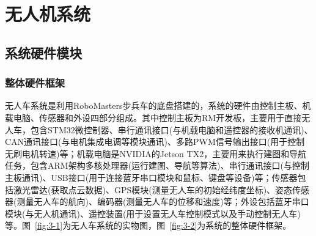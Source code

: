 
\chapter{无人机系统}
\section{系统硬件模块}
\subsection{整体硬件框架}
无人车系统是利用RoboMasters步兵车的底盘搭建的，系统的硬件由控制主板、机载电脑、传感器和外设四部分组成。其中控制主板为RM开发板，主要用于直接无人车，包含STM32微控制器、串行通讯接口(与机载电脑和遥控器的接收机通讯)、CAN通讯接口(与电机集成电调等模块通讯)、多路PWM信号输出接口(用于控制无刷电机转速)等；机载电脑是NVIDIA的Jetson TX2，主要用来执行建图和导航任务，包含ARM架构多核处理器(运行建图、导航等算法)、串行通讯接口(与控制主板通讯)、USB接口(用于连接蓝牙串口模块和鼠标、键盘等设备)等；传感器包括激光雷达(获取点云数据)、GPS模块(测量无人车的初始经纬度坐标)、姿态传感器(测量无人车的航向)、编码器(测量无人车的位移和速度)等；外设包括蓝牙串口模块(与无人机通讯)、遥控装置(用于设置无人车控制模式以及手动控制无人车)等。图~\ref{fig:3-1}为无人车系统的实物图，图~\ref{fig:3-2}为系统的整体硬件框架。

